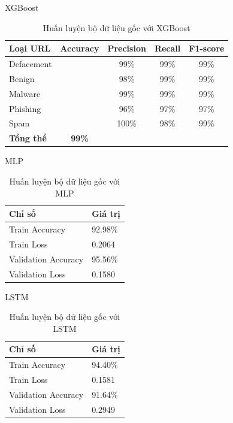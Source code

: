 \documentclass[13pt]{article}
\begin{document}
XGBoost
\begin{table}[h]
    \centering
    \renewcommand{\arraystretch}{1.3} %
    \begin{tabular}{|l|c|c|c|c|}
        \hline
        \rowcolor[HTML]{C0C0C0} %
        \textbf{Loại URL} & \textbf{Accuracy} & \textbf{Precision} & \textbf{Recall} & \textbf{F1-score} \\ 
        \hline
        Defacement &  & 99\% & 99\% & 99\% \\ 
        \hline
        Benign &  & 98\% & 99\% & 99\% \\ 
        \hline
        Malware &  & 99\% & 99\% & 99\% \\ 
        \hline
        Phishing &  & 96\% & 97\% & 97\% \\ 
        \hline
        Spam &  & 100\% & 98\% & 99\% \\ 
        \hline
        \textbf{Tổng thể} & \textbf{99\%} &  &  &  \\ 
        \hline
    \end{tabular}
    \caption{Huấn luyện bộ dữ liệu gốc với XGBoost}
    \label{tab:logistic_regression}
\end{table}

MLP
\begin{table}[h]
    \centering
    \renewcommand{\arraystretch}{1.4} %
    \begin{tabular}{|p{5cm}|p{3cm}|}
        \hline
        \rowcolor[HTML]{C0C0C0} %
        \textbf{Chỉ số} & \textbf{Giá trị} \\ 
        \hline
        Train Accuracy & 92.98\% \\ 
        \hline
        Train Loss & 0.2064 \\ 
        \hline
        Validation Accuracy & 95.56\% \\ 
        \hline
        Validation Loss & 0.1580 \\ 
        \hline
    \end{tabular}
    \caption{Huấn luyện bộ dữ liệu gốc với MLP}
    \label{tab:mlp_training}
\end{table}

LSTM
\begin{table}[h]
    \centering
    \renewcommand{\arraystretch}{1.4} %
    \begin{tabular}{|p{5cm}|p{3cm}|}
        \hline
        \rowcolor[HTML]{C0C0C0} %
        \textbf{Chỉ số} & \textbf{Giá trị} \\ 
        \hline
        Train Accuracy & 94.40\% \\ 
        \hline
        Train Loss & 0.1581 \\ 
        \hline
        Validation Accuracy & 91.64\% \\ 
        \hline
        Validation Loss & 0.2949 \\ 
        \hline
    \end{tabular}
    \caption{Huấn luyện bộ dữ liệu gốc với LSTM}
    \label{tab:mlp_training}
\end{table}
\end{document}
